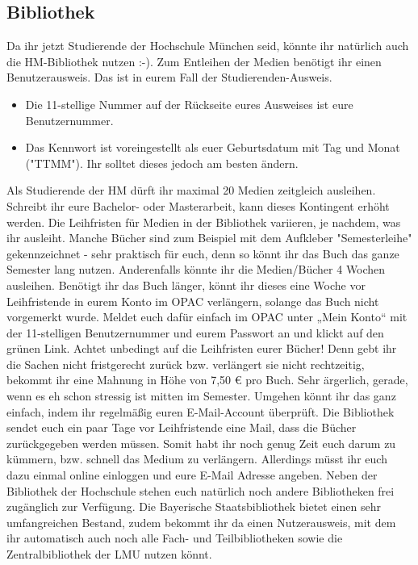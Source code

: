\subsection{Bibliothek}
Da ihr jetzt Studierende der Hochschule München seid, könnte ihr 
natürlich auch die HM-Bibliothek nutzen :-).
Zum Entleihen der Medien benötigt ihr einen Benutzerausweis. Das ist 
in eurem Fall der Studierenden-Ausweis.
\begin{itemize}
\item Die 11-stellige Nummer auf der Rückseite eures Ausweises ist eure 
Benutzernummer. 
\item Das Kennwort ist voreingestellt als euer Geburtsdatum mit Tag und 
Monat ("TTMM"). Ihr solltet dieses jedoch am besten ändern. 
\end{itemize}
Als Studierende der HM dürft ihr maximal 20 Medien zeitgleich 
ausleihen. Schreibt ihr eure Bachelor- oder Masterarbeit, kann dieses 
Kontingent erhöht werden. Die Leihfristen für Medien in der Bibliothek 
variieren, je nachdem, was ihr ausleiht. Manche Bücher sind zum 
Beispiel mit dem Aufkleber "Semesterleihe" gekennzeichnet - sehr 
praktisch für euch, denn so könnt ihr das Buch das ganze Semester 
lang nutzen. Anderenfalls könnte ihr die Medien/Bücher 4 Wochen 
ausleihen. Benötigt ihr das Buch länger, könnt ihr dieses eine Woche 
vor Leihfristende in eurem Konto im OPAC verlängern, solange das 
Buch nicht vorgemerkt wurde. Meldet euch dafür einfach im OPAC 
unter „Mein Konto“ mit der 11-stelligen Benutzernummer und eurem 
Passwort an und klickt auf den grünen Link.\doublebreak
Achtet unbedingt auf die Leihfristen eurer Bücher! Denn gebt ihr die 
Sachen nicht fristgerecht zurück bzw. verlängert sie nicht rechtzeitig, 
bekommt ihr eine Mahnung in Höhe von 7,50 € pro Buch. Sehr ärgerlich, 
gerade, wenn es eh schon stressig ist mitten im Semester. \doublebreak
Umgehen könnt ihr das ganz einfach, indem ihr regelmäßig euren 
E-Mail-Account überprüft. Die Bibliothek sendet euch ein paar Tage 
vor Leihfristende eine Mail, dass die Bücher zurückgegeben werden 
müssen. Somit habt ihr noch genug Zeit euch darum zu kümmern, 
bzw. schnell das Medium zu verlängern. Allerdings müsst ihr euch dazu 
einmal online einloggen und eure E-Mail Adresse angeben.\doublebreak
Neben der Bibliothek der Hochschule stehen euch natürlich noch 
andere Bibliotheken frei zugänglich zur Verfügung. Die Bayerische 
Staatsbibliothek bietet einen sehr umfangreichen Bestand, zudem 
bekommt ihr da einen Nutzerausweis, mit dem ihr automatisch auch 
noch alle Fach- und Teilbibliotheken sowie die 
Zentralbibliothek der LMU nutzen könnt.
